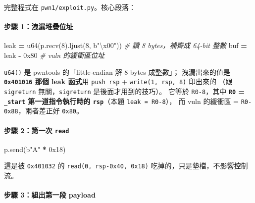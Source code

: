 \documentclass[10pt,a4paper]{article}
\newenvironment{Shaded}{\begin{snugshade}}{\end{snugshade}}
\newcommand{\BaseNTok}[1]{\textcolor[rgb]{0.00,0.00,0.81}{#1}}
\newcommand{\CharTok}[1]{\textcolor[rgb]{0.31,0.60,0.02}{#1}}
\newcommand{\CommentTok}[1]{\textcolor[rgb]{0.56,0.35,0.01}{\textit{#1}}}
\newcommand{\DecValTok}[1]{\textcolor[rgb]{0.00,0.00,0.81}{#1}}
\newcommand{\NormalTok}[1]{#1}
\newcommand{\OperatorTok}[1]{\textcolor[rgb]{0.81,0.36,0.00}{\textbf{#1}}}
\newcommand{\StringTok}[1]{\textcolor[rgb]{0.31,0.60,0.02}{#1}}
\renewenvironment{Shaded}{%
  \def\FrameCommand{\fboxsep=3.2pt\colorbox{shadecolor}}%
  \MakeFramed{\advance\hsize-\width\FrameRestore\small}%
}{%
  \endMakeFramed
}
\begin{document}
完整程式在 \texttt{pwn1/\allowbreak{}exploit.\allowbreak{}py}。核心段落：

\paragraph{步驟
1：洩漏堆疊位址}\label{ux6b65ux9a5f-1ux6d29ux6f0fux5806ux758aux4f4dux5740}

\begin{Shaded}
\begin{Highlighting}[]
\NormalTok{leak }\OperatorTok{=}\NormalTok{ u64(p.recv(}\DecValTok{8}\NormalTok{).ljust(}\DecValTok{8}\NormalTok{, }\StringTok{b"}\CharTok{\textbackslash{}x00}\StringTok{"}\NormalTok{))   }\CommentTok{\# 讀 8 bytes，補齊成 64{-}bit 整數}
\NormalTok{buf  }\OperatorTok{=}\NormalTok{ leak }\OperatorTok{{-}} \BaseNTok{0x80}                        \CommentTok{\# vuln 的緩衝區位址}
\end{Highlighting}
\end{Shaded}

\texttt{u64()} 是 pwntools 的「little-endian 解 8 bytes 成整數」；
洩漏出來的值是 \textbf{\texttt{0x401016} 那個 leak 函式}用
\texttt{push\ \allowbreak{}rsp} + \texttt{write(1,\allowbreak{}\ \allowbreak{}rsp,\allowbreak{}\ \allowbreak{}8)} 印出來的 （跟
\texttt{sigreturn} 無關，\texttt{sigreturn} 是後面才用到的技巧）。
它等於 \texttt{R0-\allowbreak{}8}，其中 \textbf{\texttt{R0} = \texttt{\_\allowbreak{}start}
第一道指令執行時的 \texttt{rsp}}（本題 \texttt{leak\ \allowbreak{}=\ \allowbreak{}R0-\allowbreak{}8}）， 而
vuln 的緩衝區 = \texttt{R0-\allowbreak{}0x88}，兩者差正好 \texttt{0x80}。

\paragraph{\texorpdfstring{步驟 2：第一次
\texttt{read}}{步驟 2：第一次 read}}\label{ux6b65ux9a5f-2ux7b2cux4e00ux6b21-read}

\begin{Shaded}
\begin{Highlighting}[]
\NormalTok{p.send(}\StringTok{b"A"} \OperatorTok{*} \BaseNTok{0x18}\NormalTok{)}
\end{Highlighting}
\end{Shaded}

這是被 \texttt{0x401032} 的 \texttt{read(0,\allowbreak{}\ \allowbreak{}rsp-\allowbreak{}0x40,\allowbreak{}\ \allowbreak{}0x18)}
吃掉的，只是墊檔，不影響控制流。

\paragraph{步驟 3：組出第一段
payload}\label{ux6b65ux9a5f-3ux7d44ux51faux7b2cux4e00ux6bb5-payload}
\end{document}
